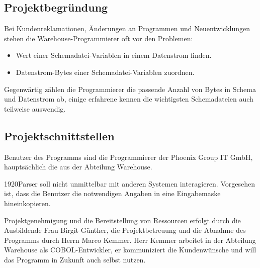 \subsection{Projektbegründung}
\label{sec:Projektbegruendung}
Bei Kundenreklamationen, Änderungen an Programmen und Neuentwicklungen stehen die Warehouse-Programmierer oft vor den Problemen:

\begin{itemize}
\item Wert einer Schemadatei-Variablen in einem Datenstrom finden.
\item Datenstrom-Bytes einer Schemadatei-Variablen zuordnen.
\end{itemize}

Gegenwärtig zählen die Programmierer die passende Anzahl von Bytes in Schema und Datenstrom ab, einige erfahrene kennen die wichtigsten Schemadateien auch teilweise auswendig. 


\subsection{Projektschnittstellen}
\label{sec:Projektschnittstellen}
Benutzer des Programms sind die Programmierer der Phoenix Group IT GmbH, hauptsächlich die aus der Abteilung Warehouse.

1920Parser soll nicht unmittelbar mit anderen Systemen interagieren. Vorgesehen ist, dass die Benutzer die notwendigen Angaben in eine Eingabemaske hineinkopieren.

Projektgenehmigung und die Bereitstellung von Ressourcen erfolgt durch die Ausbildende Frau Birgit Günther, die Projektbetreuung und die Abnahme des Programms durch Herrn Marco Kemmer. Herr Kemmer arbeitet in der Abteilung Warehouse als COBOL-Entwickler, er kommuniziert die Kundenwünsche und will das Programm in Zukunft auch selbst nutzen.




